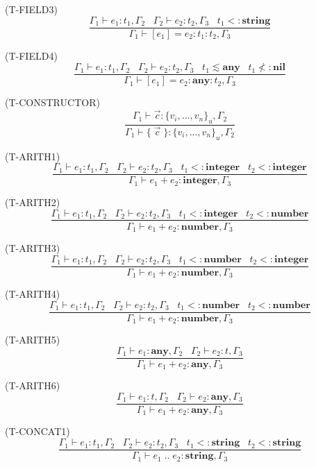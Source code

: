 \documentclass{paper}
\newcommand{\Any}{\mathbf{any}}
\newcommand{\Nil}{\mathbf{nil}}
\newcommand{\Integer}{\mathbf{integer}}
\newcommand{\Number}{\mathbf{number}}
\newcommand{\String}{\mathbf{string}}
\newcommand{\mylabel}[1]{\; (\textsc{#1})}
\newcommand{\env}{\Gamma}
\newcommand{\subtype}{<:}
\begin{document}
\mylabel{T-FIELD3}
\[
\dfrac{\env_{1} \vdash e_{1}:t_{1}, \env_{2} \;\;\;
       \env_{2} \vdash e_{2}:t_{2}, \env_{3} \;\;\;
       t_{1} \subtype \String}
      {\env_{1} \vdash [e_{1}] = e_{2}:t_{1}:t_{2}, \env_{3}}
\]

\mylabel{T-FIELD4}
\[
\dfrac{\env_{1} \vdash e_{1}:t_{1}, \env_{2} \;\;\;
       \env_{2} \vdash e_{2}:t_{2}, \env_{3} \;\;\;
       t_{1} \lesssim \Any \;\;\;
       t_{1} \not\subtype \Nil}
      {\env_{1} \vdash [e_{1}] = e_{2}:\Any:t_{2}, \env_{3}}
\]

\mylabel{T-CONSTRUCTOR}
\[
\dfrac{\env_{1} \vdash \vec{c}:\{ v_{i}, ..., v_{n} \}_{u}, \env_{2}}
      {\env_{1} \vdash \{ \; \vec{c} \; \}:\{ v_{i}, ..., v_{n} \}_{u}, \env_{2}}
\]

\mylabel{T-ARITH1}
\[
\dfrac{\env_{1} \vdash e_{1}:t_{1}, \env_{2} \;\;\;
       \env_{2} \vdash e_{2}:t_{2}, \env_{3} \;\;\;
       t_{1} \subtype \Integer \;\;\;
       t_{2} \subtype \Integer}
      {\env_{1} \vdash e_{1} + e_{2}:\Integer, \env_{3}}
\]

\mylabel{T-ARITH2}
\[
\dfrac{\env_{1} \vdash e_{1}:t_{1}, \env_{2} \;\;\;
       \env_{2} \vdash e_{2}:t_{2}, \env_{3} \;\;\;
       t_{1} \subtype \Integer \;\;\;
       t_{2} \subtype \Number}
      {\env_{1} \vdash e_{1} + e_{2}:\Number, \env_{3}}
\]

\mylabel{T-ARITH3}
\[
\dfrac{\env_{1} \vdash e_{1}:t_{1}, \env_{2} \;\;\;
       \env_{2} \vdash e_{2}:t_{2}, \env_{3} \;\;\;
       t_{1} \subtype \Number \;\;\;
       t_{2} \subtype \Integer}
      {\env_{1} \vdash e_{1} + e_{2}:\Number, \env_{3}}
\]

\mylabel{T-ARITH4}
\[
\dfrac{\env_{1} \vdash e_{1}:t_{1}, \env_{2} \;\;\;
       \env_{2} \vdash e_{2}:t_{2}, \env_{3} \;\;\;
       t_{1} \subtype \Number \;\;\;
       t_{2} \subtype \Number}
      {\env_{1} \vdash e_{1} + e_{2}:\Number, \env_{3}}
\]

\mylabel{T-ARITH5}
\[
\dfrac{\env_{1} \vdash e_{1}:\Any, \env_{2} \;\;\;
       \env_{2} \vdash e_{2}:t, \env_{3}}
      {\env_{1} \vdash e_{1} + e_{2}:\Any, \env_{3}}
\]

\mylabel{T-ARITH6}
\[
\dfrac{\env_{1} \vdash e_{1}:t, \env_{2} \;\;\;
       \env_{2} \vdash e_{2}:\Any, \env_{3}}
      {\env_{1} \vdash e_{1} + e_{2}:\Any, \env_{3}}
\]

\mylabel{T-CONCAT1}
\[
\dfrac{\env_{1} \vdash e_{1}:t_{1}, \env_{2} \;\;\;
       \env_{2} \vdash e_{2}:t_{2}, \env_{3} \;\;\;
       t_{1} \subtype \String \;\;\;
       t_{2} \subtype \String}
      {\env_{1} \vdash e_{1} \; {..} \; e_{2}:\String, \env_{3}}
\]
\end{document}
